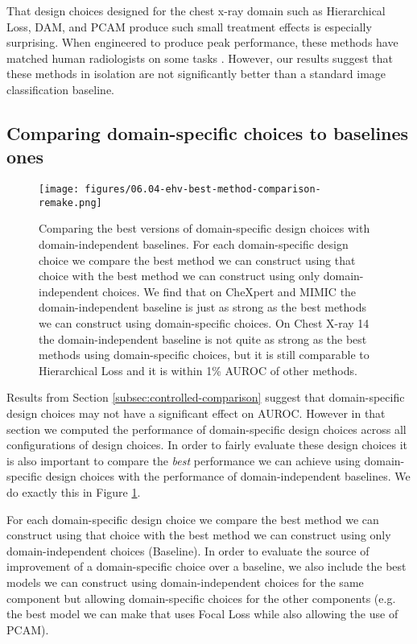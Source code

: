 That design choices designed for the chest x-ray domain such as Hierarchical Loss, DAM, and PCAM produce such small treatment effects is especially surprising. When engineered to produce peak performance, these methods have matched human radiologists on some tasks \citep{irvin2019chexpert}. However, our results suggest that these methods in isolation are not significantly better than a standard image classification baseline.

\subsection{Comparing domain-specific choices to baselines ones}
\begin{figure}
    \centering
    \texttt{[image: figures/06.04-ehv-best-method-comparison-remake.png]}
    \caption{
        Comparing the best versions of domain-specific design choices with domain-independent baselines. For each domain-specific design choice we compare the best method we can construct using that choice with the best method we can construct using only domain-independent choices. We find that on CheXpert and MIMIC the domain-independent baseline is just as strong as the best methods we can construct using domain-specific choices. On Chest X-ray 14 the domain-independent baseline is not quite as strong as the best methods using domain-specific choices, but it is still comparable to Hierarchical Loss and it is within 1\% AUROC of other methods.
    }
    \label{fig:best-method-per-choice}
\end{figure}
Results from Section \ref{subsec:controlled-comparison} suggest that domain-specific design choices may not have a significant effect on AUROC. However in that section we computed the performance of domain-specific design choices across all configurations of design choices. In order to fairly evaluate these design choices it is also important to compare the \emph{best} performance we can achieve using domain-specific design choices with the performance of domain-independent baselines. We do exactly this in Figure \ref{fig:best-method-per-choice}.

For each domain-specific design choice we compare the best method we can construct using that choice with the best method we can construct using only domain-independent choices (Baseline). In order to evaluate the source of improvement of a domain-specific choice over a baseline, we also include the best models we can construct using domain-independent choices for the same component but allowing domain-specific choices for the other components (e.g. the best model we can make that uses Focal Loss while also allowing the use of PCAM). 

